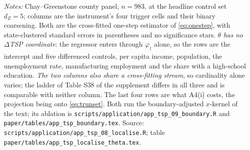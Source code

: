\documentclass[
  12pt]{article}
\newcommand{\1}[1]{\mathds{1}\left[#1\right]}
\theoremstyle{plain}
\theoremstyle{definition}
\theoremstyle{definition}
\theoremstyle{remark}
\newcommand{\vdagger}{\varphi_{\dagger}}
\begin{document}
%
%
\begin{table}[!htbp]
\centering
\begin{threeparttable}
\caption{The slope vector at four instrument cells and at the binary coarsening}
\label{tab:app-theta}
\footnotesize

\begin{tablenotes}\scriptsize
\item \textit{Notes:} Chay--Greenstone county panel, $n=983$, at the headline
control set $d_Z=5$; columns are the instrument's four trigger cells and their
binary coarsening. Both are the cross-fitted one-step estimator of
\eqref{eq:onestep}, with state-clustered standard errors in parentheses and no
significance stars. \emph{$\theta$ has no $\Delta$TSP coordinate}: the regressor
enters through $\vdagger$ alone, so the rows are the intercept and five
differenced controls, per capita income, population, the unemployment rate,
manufacturing employment and the share with a high-school education.
\emph{The two columns also share a cross-fitting stream}, so cardinality alone
varies; the ladder of Table S38 of the supplement differs in all three and is
comparable with neither column. The last four rows are what A4(i) costs, the
projection being onto \eqref{eq:trunset}. Both run the boundary-adjusted
$x$-kernel of the text; its ablation is
\texttt{scripts/application/app\_tsp\_09\_boundary.R} and
\texttt{paper/tables/app\_tsp\_boundary.tex}. Source:
\texttt{scripts/application/app\_tsp\_08\_localise.R}; table
\texttt{paper/tables/app\_tsp\_localise\_theta.tex}.
\end{tablenotes}
\end{threeparttable}
\end{table}
\end{document}
